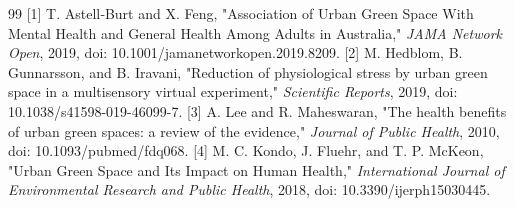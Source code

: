 \documentclass[11pt]{article}
\begin{document}
\begin{thebibliography}{99}
 [1] T. Astell‐Burt and X. Feng, "Association of Urban Green Space With Mental Health and General Health Among Adults in Australia," \textit{JAMA Network Open}, 2019, doi: 10.1001/jamanetworkopen.2019.8209.
 [2] M. Hedblom, B. Gunnarsson, and B. Iravani, "Reduction of physiological stress by urban green space in a multisensory virtual experiment," \textit{Scientific Reports}, 2019, doi: 10.1038/s41598-019-46099-7.
 [3] A. Lee and R. Maheswaran, "The health benefits of urban green spaces: a review of the evidence," \textit{Journal of Public Health}, 2010, doi: 10.1093/pubmed/fdq068.
 [4] M. C. Kondo, J. Fluehr, and T. P. McKeon, "Urban Green Space and Its Impact on Human Health," \textit{International Journal of Environmental Research and Public Health}, 2018, doi: 10.3390/ijerph15030445.
\end{thebibliography}
\end{document}
